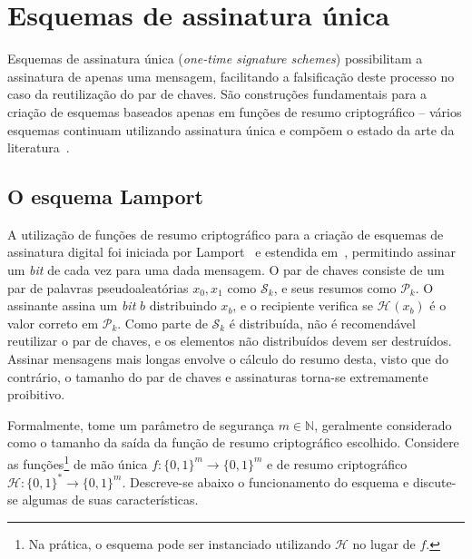 \documentclass[12pt]{report}
\newcommand{\hh}{\mathcal{H}}
\newcommand{\pk}{\mathcal{P}_k}
\newcommand{\sk}{\mathcal{S}_k}
\newcommand{\hash}[2][]{\mathcal{H}^{#1}(#2)}
\newcommand{\binwds}[1]{\{0, 1\}^{#1}}
\newcommand{\fhash}[1]{\hh{} : \binwds{*} \longrightarrow \binwds{#1}}
\begin{document}
\section{Esquemas de assinatura única}

Esquemas de assinatura única (\emph{one-time signature schemes}) possibilitam a
assinatura de apenas uma mensagem, facilitando a falsificação deste processo no
caso da reutilização do par de chaves. São construções fundamentais para a
criação de esquemas baseados apenas em funções de resumo criptográfico --
vários esquemas continuam utilizando assinatura única e compõem o estado da
arte da literatura~\cite{sphincsplus,irtf-cfrg-xmss-hash-based-signatures-12}.

\subsection{O esquema Lamport}

A utilização de funções de resumo criptográfico para a criação de esquemas de
assinatura digital foi iniciada por Lamport~\cite{lamport1979constructing}
e estendida em~\cite{Diffie:2006:NDC:2263321.2269104, Merkle:1989:CDS:118209.118230},
permitindo assinar um \emph{bit} de cada vez para uma dada mensagem. O par de
chaves consiste de um par de palavras pseudoaleatórias $x_0, x_1$ como $\sk{}$,
e seus resumos como $\pk{}$. O assinante assina um \emph{bit} $b$ distribuindo
$x_b$, e o recipiente verifica se $\hash{x_b}$ é o valor correto em $\pk{}$.
Como parte de $\sk{}$ é distribuída, não é recomendável reutilizar o par de
chaves, e os elementos não distribuídos devem ser destruídos. Assinar mensagens
mais longas envolve o cálculo do resumo desta, visto que do contrário, o
tamanho do par de chaves e assinaturas torna-se extremamente proibitivo.

Formalmente, tome um parâmetro de segurança $m \in \mathbb{N}$, geralmente considerado como o
tamanho da saída da função de resumo criptográfico escolhido. Considere as
funções\footnote{Na prática, o esquema pode ser instanciado utilizando $\hh{}$
no lugar de $f$.} de mão única $f : \binwds{m} \longrightarrow \binwds{m}$ e de
resumo criptográfico $\fhash{m}$.  Descreve-se abaixo o funcionamento do
esquema e discute-se algumas de suas características.
\end{document}
